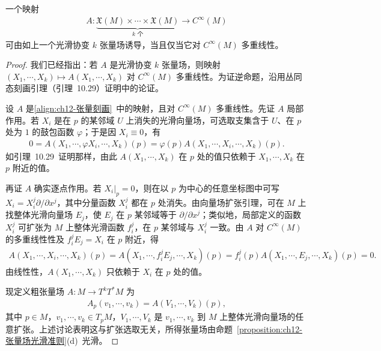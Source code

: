 \documentclass[../../main.tex]{subfiles}
\begin{document}
\begin{lemma}[张量刻画引理]\label{lemma:ch12-张量刻画}
一个映射
\begin{align}
A\colon \underbrace{\mathfrak X(M)\times\cdots\times\mathfrak X(M)}_{k\text{ 个}}\to C^\infty(M)\label{align:ch12-张量刻画}
\end{align}
可由如上一个光滑协变 $k$ 张量场诱导，当且仅当它对 $C^\infty(M)$ 多重线性。
\end{lemma}

\begin{proof}
我们已经指出：若 $A$ 是光滑协变 $k$ 张量场，则映射 $(X_1,\cdots ,X_k)\mapsto A(X_1,\cdots ,X_k)$ 对 $C^\infty(M)$ 多重线性。为证逆命题，沿用丛同态刻画引理（引理~10.29）证明中的论证。

设 $A$ 是\eqref{align:ch12-张量刻画}~中的映射，且对 $C^\infty(M)$ 多重线性。先证 $A$ 局部作用。若 $X_i$ 是在 $p$ 的某邻域 $U$ 上消失的光滑向量场，可选取支集含于 $U$、在 $p$ 处为 $1$ 的鼓包函数 $\varphi$；于是因 $X_i\equiv 0$，有
\begin{align*}
0=A(X_1,\cdots ,\varphi X_i,\cdots ,X_k)(p)=\varphi(p)A(X_1,\cdots ,X_i,\cdots ,X_k)(p).
\end{align*}
如引理~10.29~证明那样，由此 $A(X_1,\cdots ,X_k)$ 在 $p$ 处的值只依赖于 $X_1,\cdots ,X_k$ 在 $p$ 附近的值。

再证 $A$ 确实逐点作用。若 $X_i|_p=0$，则在以 $p$ 为中心的任意坐标图中可写 $X_i=X_i^j\partial/\partial x^j$，其中分量函数 $X_i^j$ 都在 $p$ 处消失。由向量场扩张引理，可在 $M$ 上找整体光滑向量场 $E_j$，使 $E_j$ 在 $p$ 某邻域等于 $\partial/\partial x^j$；类似地，局部定义的函数 $X_i^j$ 可扩张为 $M$ 上整体光滑函数 $f_i^j$，在 $p$ 某邻域与 $X_i^j$ 一致。由 $A$ 对 $C^\infty(M)$ 的多重线性性及 $f_i^j E_j=X_i$ 在 $p$ 附近，得
\begin{align*}
A(X_1,\cdots ,X_i,\cdots ,X_k)(p)=A(X_1,\cdots ,f_i^j E_j,\cdots ,X_k)(p)=f_i^j(p)A(X_1,\cdots ,E_j,\cdots ,X_k)(p)=0.
\end{align*}
由线性性，$A(X_1,\cdots ,X_k)$ 只依赖于 $X_i$ 在 $p$ 处的值。

现定义粗张量场 $A\colon M\to T^kT^*M$ 为
\begin{align*}
A_p(v_1,\cdots ,v_k)=A(V_1,\cdots ,V_k)(p),
\end{align*}
其中 $p\in M$，$v_1,\cdots ,v_k\in T_pM$，$V_1,\cdots ,V_k$ 是 $v_1,\cdots ,v_k$ 到 $M$ 上整体光滑向量场的任意扩张。上述讨论表明这与扩张选取无关，所得张量场由命题~\ref{proposition:ch12-张量场光滑准则}(d)~光滑。
\end{proof}
\end{document}
